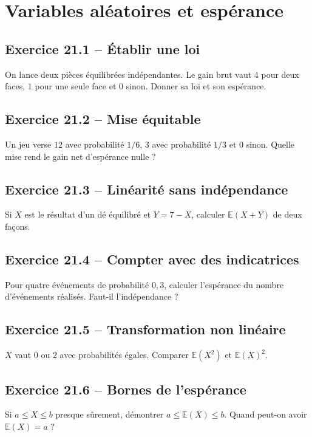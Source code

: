 \chapter{Variables aléatoires et espérance}
\section*{Exercice 21.1 -- Établir une loi}
On lance deux pièces équilibrées indépendantes. Le gain brut vaut $4$ pour deux faces, $1$ pour une seule face et $0$ sinon. Donner sa loi et son espérance.

\section*{Exercice 21.2 -- Mise équitable}
Un jeu verse $12$ avec probabilité $1/6$, $3$ avec probabilité $1/3$ et $0$ sinon. Quelle mise rend le gain net d'espérance nulle ?

\section*{Exercice 21.3 -- Linéarité sans indépendance}
Si $X$ est le résultat d'un dé équilibré et $Y=7-X$, calculer $\mathbb E(X+Y)$ de deux façons.

\section*{Exercice 21.4 -- Compter avec des indicatrices}
Pour quatre événements de probabilité $0{,}3$, calculer l'espérance du nombre d'événements réalisés. Faut-il l'indépendance ?

\section*{Exercice 21.5 -- Transformation non linéaire}
$X$ vaut $0$ ou $2$ avec probabilités égales. Comparer $\mathbb E(X^2)$ et $\mathbb E(X)^2$.

\section*{Exercice 21.6 -- Bornes de l'espérance}
Si $a\le X\le b$ presque sûrement, démontrer $a\le\mathbb E(X)\le b$. Quand peut-on avoir $\mathbb E(X)=a$ ?
